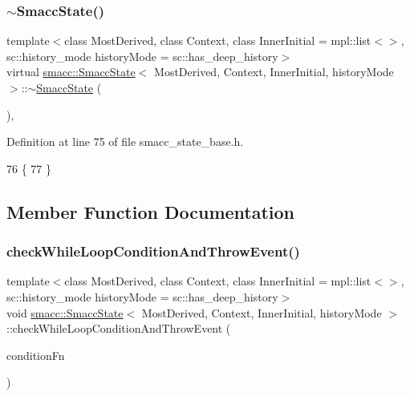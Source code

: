 \subsubsection{\texorpdfstring{$\sim$\+Smacc\+State()}{~SmaccState()}}
{\footnotesize\ttfamily template$<$class Most\+Derived, class Context, class Inner\+Initial = mpl\+::list$<$$>$, sc\+::history\+\_\+mode history\+Mode = sc\+::has\+\_\+deep\+\_\+history$>$ \\
virtual \hyperlink{classsmacc_1_1SmaccState}{smacc\+::\+Smacc\+State}$<$ Most\+Derived, Context, Inner\+Initial, history\+Mode $>$\+::$\sim$\hyperlink{classsmacc_1_1SmaccState}{Smacc\+State} (\begin{DoxyParamCaption}{ }\end{DoxyParamCaption})\hspace{0.3cm}{\ttfamily [inline]}, {\ttfamily [virtual]}}



Definition at line 75 of file smacc\+\_\+state\+\_\+base.\+h.


\begin{DoxyCode}
76   \{
77   \}
\end{DoxyCode}


\subsection{Member Function Documentation}
\mbox{\label{classsmacc_1_1SmaccState_a80082718f226bebedb589f0c4696001d}} 
\subsubsection{\texorpdfstring{check\+While\+Loop\+Condition\+And\+Throw\+Event()}{checkWhileLoopConditionAndThrowEvent()}}
{\footnotesize\ttfamily template$<$class Most\+Derived, class Context, class Inner\+Initial = mpl\+::list$<$$>$, sc\+::history\+\_\+mode history\+Mode = sc\+::has\+\_\+deep\+\_\+history$>$ \\
void \hyperlink{classsmacc_1_1SmaccState}{smacc\+::\+Smacc\+State}$<$ Most\+Derived, Context, Inner\+Initial, history\+Mode $>$\+::check\+While\+Loop\+Condition\+And\+Throw\+Event (\begin{DoxyParamCaption}\item[{\hyperlink{classbool}{bool}(Most\+Derived\+::$\ast$)()}]{condition\+Fn }\end{DoxyParamCaption})\hspace{0.3cm}{\ttfamily [inline]}}



